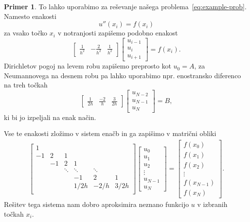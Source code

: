 \documentclass[a4paper,twoside]{article}
\theoremstyle{definition} %
\newtheorem{primer}[definicija]{Primer}
\theoremstyle{plain} %
\numberwithin{equation}{section}
\begin{document}
\begin{primer}
To lahko uporabimo za reševanje našega problema~\eqref{eq:example-prob}.
Namesto enakosti
\[ u''(x_i) = f(x_i) \]
za vsako točko $x_i$ v notranjosti zapišemo podobno enakost
\[
  \begin{bmatrix}
    \frac{1}{h^2} & -\frac{2}{h^2} & \frac{1}{h^2}
  \end{bmatrix}\begin{bmatrix}
    u_{i-1} \\ u_{i} \\ u_{i+1}
  \end{bmatrix} = f(x_i).
\]
Dirichletov pogoj na levem robu zapišemo preprosto kot $u_0 = A$,
za Neumannovega na desnem robu pa lahko uporabimo npr. enostransko diferenco
na treh točkah \[
  \begin{bmatrix}
    \frac{1}{2h} & \frac{-2}{h} & \frac{3}{2h}
  \end{bmatrix}\begin{bmatrix}
    u_{N-2} \\ u_{N-1} \\ u_{N}
  \end{bmatrix} = B,
\]
ki bi jo izpeljali na enak način.

Vse te enakosti zložimo v sistem enačb in ga zapišimo v matrični obliki
\begin{align*}
  \begin{bmatrix}
    1 &  \\
    -1 & 2 & 1 \\
    & -1 & 2 & 1 \\
    & & \!\ddots & \!\ddots & \! \ddots \\
    &&& -1 & 2 & 1 \\
    &&& 1/2h & -2/h & 3/2h \\
  \end{bmatrix}
\begin{bmatrix}
  u_0 \\ u_1 \\ u_2 \\ \vdots \\ u_{N-1} \\ u_N
\end{bmatrix}
 =
 \begin{bmatrix}
   f(x_0) \\
   f(x_1) \\
   f(x_2) \\
   \vdots \\
   f(x_{N-1}) \\
   f(x_N)
 \end{bmatrix}.
\end{align*}
Rešitev tega sistema nam dobro aproksimira neznano funkcijo $u$ v izbranih
točkah $x_i$.
\end{primer}
\end{document}
